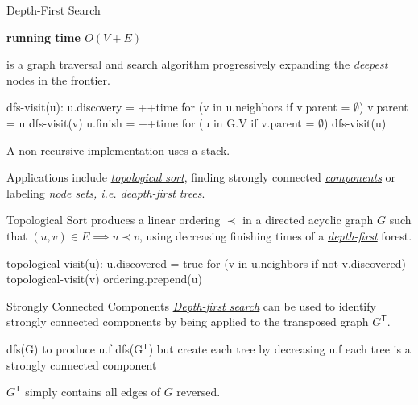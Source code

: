 \documentclass{cognito}
\begin{document}

\begin{note}{Depth-First Search}
	\begin{mdframed}[linecolor=black!25!white]
		\bf running time $O(V + E)$
	\end{mdframed}
	 is a graph traversal and search algorithm progressively expanding the \emph{deepest} nodes in the frontier.
	\begin{largecode}
 dfs-visit(u):
	u.discovery = ++time
	for (v in u.neighbors if v.parent = $\emptyset$)
		v.parent = u
		dfs-visit(v)
	u.finish = ++time
 for (u in G.V if v.parent = $\emptyset$) dfs-visit(u)
	\end{largecode}%
	\begin{remark} A non-recursive implementation uses a stack. \end{remark}
	\begin{remark}
	Applications include \hyperref[note:Topological Sort]{\it topological sort}, 
	finding strongly connected \hyperref[note:Strongly Connected Components]{\it components}
	or labeling {\it node sets, i.e. deapth-first trees}. \end{remark}
	\vspace{-5pt}
\end{note}


\begin{note}{Topological Sort}
	 produces a linear ordering $\prec$ in a directed acyclic graph $G$
	such that $(u, v) \in E \implies u \prec v$, using decreasing finishing times of a \hyperref[note:Depth-First Search]{\it depth-first} forest.
	
	\begin{largecode}
 topological-visit(u):
	u.discovered = true
	for (v in u.neighbors if not v.discovered)
		topological-visit(v)
	ordering.prepend(u)
	\end{largecode}
	\vspace{-5pt}
\end{note}

\begin{note}{Strongly Connected Components}
	\hyperref[note:Depth-First Search]{\it Depth-first search} can be used to identify strongly connected components
	by being applied to the transposed graph $G^\mathsf{T}$.
	\begin{largecode}
 dfs(G) to produce u.f
 dfs(G$^\mathsf{T}$) but create each tree by decreasing u.f
 each tree is a strongly connected component
	\end{largecode}%
	\begin{remark} $G^\mathsf{T}$ simply contains all edges of $G$ reversed.\end{remark}\vspace{-5pt}
\end{note}
\end{document}
